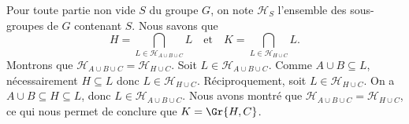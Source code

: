Pour toute partie non vide $S$ du groupe $G$, on note $\mathcal{H}_S$ l'ensemble
des sous-groupes de $G$ contenant $S$. Nous savons que
\[
  H = \bigcap_{L\in\mathcal{H}_{A\cup B\cup C}} L
  \quad\text{et}\quad
  K = \bigcap_{L\in\mathcal{H}_{H\cup C}} L.
\]
Montrons que $\mathcal{H}_{A\cup B\cup C} = \mathcal{H}_{H\cup C}$.
Soit $L\in\mathcal{H}_{A\cup B\cup C}$. Comme $A\cup B\subseteq L$, nécessairement
$H\subseteq L$ donc $L\in\mathcal{H}_{H\cup C}$. Réciproquement, soit
$L\in\mathcal{H}_{H\cup C}$. On a $A\cup B\subseteq H\subseteq L$, donc
$L\in\mathcal{H}_{A\cup B\cup C}$. Nous avons montré que $\mathcal{H}_{A\cup
B\cup C} = \mathcal{H}_{H\cup C}$, ce qui nous permet de conclure que
$K = \Gr{H,C}$.
